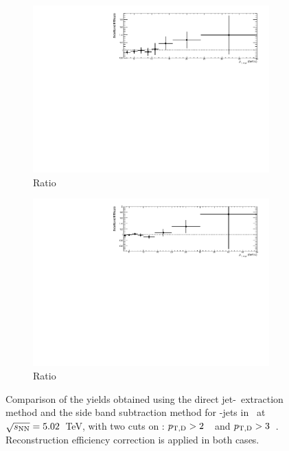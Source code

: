 \begin{figure}[bth]
\begin{subfigure}[b]{0.45\textwidth}
\includegraphics[width=\textwidth]{pPbplots/methodsComparison/DjetSpectraRatio_FASTwoSDD_eff_ptD2}
\caption{Ratio}
\end{subfigure}
\begin{subfigure}[b]{0.45\textwidth}
\includegraphics[width=\textwidth]{pPbplots/methodsComparison/DjetSpectraRatio_FASTwoSDD_eff_ptD3}
\caption{Ratio}
\end{subfigure}
\caption{Comparison of the yields obtained using the direct jet-\pt\ extraction method and the side band subtraction method for \Dstar-jets in \pPb\ at $\sqrt{s_{\rm NN}}=5.02$~TeV, with two cuts on \ptd: $p_{\mathrm{T,D}}>2$~\GeVc\ and $p_{\mathrm{T,D}}>3$~\GeVc.
Reconstruction efficiency correction is applied in both cases.}
\label{fig:JetPt_pPb_corrDrec_Dstar}
\end{figure}
